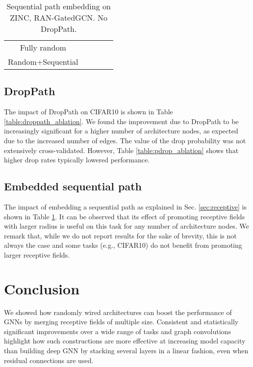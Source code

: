 \documentclass[10pt,twocolumn,twoside]{IEEEtran}
\begin{document}
\begin{table}[t!]
\centering
\caption{Sequential path embedding on ZINC, RAN-GatedGCN. No DropPath.} \label{table:linear_ablation}
\setlength\tabcolsep{2pt} 
\renewcommand{\arraystretch}{1.5}
\vspace{-11pt}
\centering
\small
\begin{tabular}{ccccc}
         &  &  &  \\ \hline
        Fully random &  &  &  \\
        Random+Sequential &  &  &  \\ \hline
    \end{tabular}
\end{table}


\subsection{DropPath}

The impact of DropPath on CIFAR10 is shown in Table \ref{table:droppath_ablation}. We found the improvement due to DropPath to be increasingly significant for a higher number of architecture nodes, as expected due to the increased number of edges. The value of the drop probability  was not extensively cross-validated. However, Table \ref{table:pdrop_ablation} shows that higher drop rates typically lowered performance.


\subsection{Embedded sequential path}

The impact of embedding a sequential path as explained in Sec. \ref{sec:receptive} is shown in Table \ref{table:linear_ablation}. It can be observed that its effect of promoting receptive fields with larger radius is useful on this task for any number of architecture nodes. We remark that, while we do not report results for the sake of brevity, this is not always the case and some tasks (e.g., CIFAR10) do not benefit from promoting larger receptive fields.






\section{Conclusion}

We showed how randomly wired architectures can boost the performance of GNNs by merging receptive fields of multiple size. Consistent and statistically significant improvements over a wide range of tasks and graph convolutions highlight how such constructions are more effective at increasing model capacity than building deep GNN by stacking several layers in a linear fashion, even when residual connections are used.




\end{document}
